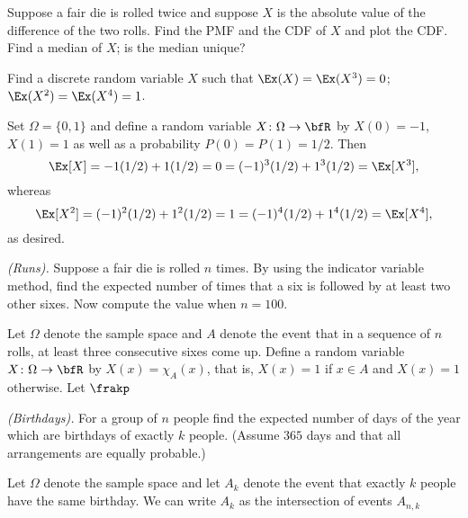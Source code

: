 \begin{problem}[Handout 6, \# 5]
  Suppose a fair die is rolled twice and suppose \(X\) is the absolute
  value of the difference of the two rolls. Find the PMF and the CDF of
  \(X\) and plot the CDF. Find a median of \(X\); is the median unique?
\end{problem}
\begin{solution}

\end{solution}
\newpage

\begin{problem}[Handout 6, \# 7]
  Find a discrete random variable \(X\) such that \(\Ex(X)=\Ex(X^3)=0\);
  \(\Ex(X^2)=\Ex(X^4)=1\).
\end{problem}
\begin{solution}
  Set \(\Omega=\{0,1\}\) and define a random variable
  \(X\colon\Omega\to\bfR\) by \(X(0)= -1\), \(X(1)= 1\) as well as a
  probability \(P(0)=P(1)=1/2\). Then
  \[
    \Ex[X]=-1(1/2)+1(1/2)=0=(-1)^3(1/2)+1^3(1/2)=\Ex[X^3],
  \]
  whereas
  \[
    \Ex[X^2]=(-1)^2(1/2)+1^2(1/2)=1=(-1)^4(1/2)+1^4(1/2)=\Ex[X^4],
  \]
  as desired.
\end{solution}
\newpage

\begin{problem}[Handout 6, \# 9]
  \emph{(Runs).} Suppose a fair die is rolled \(n\) times. By using the
  indicator variable method, find the expected number of times that a six
  is followed by at least two other sixes. Now compute the value when
  \(n=100\).
\end{problem}
\begin{solution}
  Let \(\Omega\) denote the sample space and \(A\) denote the event that in
  a sequence of \(n\) rolls, at least three consecutive sixes come
  up. Define a random variable \(X\colon\Omega\to\bfR\) by
  \(X(x)=\chi_{A}(x)\), that is, \(X(x)=1\) if \(x\in A\) and \(X(x)=1\)
  otherwise. Let \(\frakp\)
\end{solution}
\newpage

\begin{problem}[Handout 6, \# 10]
  \emph{(Birthdays).} For a group of \(n\) people find the expected number
  of days of the year which are birthdays of exactly \(k\) people. (Assume
  \(365\) days and that all arrangements are equally probable.)
\end{problem}
\begin{solution}
  Let \(\Omega\) denote the sample space and let \(A_k\) denote the event
  that exactly \(k\) people have the same birthday. We can write \(A_k\) as
  the intersection of events \(A_{n,k}\)
\end{solution}
\newpage

